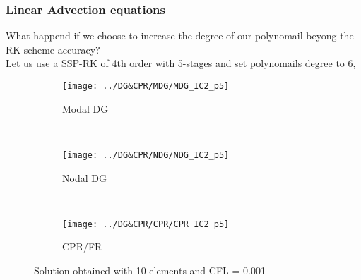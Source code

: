 \begin{frame} \frametitle{Linear Advection equations}
What happend if we choose to increase the degree of our polynomail beyong the RK scheme accuracy?\\
Let us use a SSP-RK of 4th order with 5-stages and set polynomails degree to 6,
	\begin{figure}
        \centering
        \begin{subfigure}[b]{0.31\textwidth}
                \centering
                \texttt{[image: ../DG\&CPR/MDG/MDG\_IC2\_p5]}
                \caption{Modal DG}
                \label{fig:MDG_IC2_p5_averages}
        \end{subfigure}%
				~
        \begin{subfigure}[b]{0.31\textwidth}
                \centering
                \texttt{[image: ../DG\&CPR/NDG/NDG\_IC2\_p5]}
                \caption{Nodal DG}
                \label{fig:NDG_IC2_p5_averages}
        \end{subfigure}
				~
        \begin{subfigure}[b]{0.31\textwidth}
								\centering
                \texttt{[image: ../DG\&CPR/CPR/CPR\_IC2\_p5]}
                \caption{CPR/FR}
                \label{fig:CPR_IC2_p5_averages}
        \end{subfigure}
				\caption{Solution obtained with 10 elements and CFL = 0.001}
				\label{fig:compareLinearAdvection_p5averages}
	\end{figure}
\end{frame}


